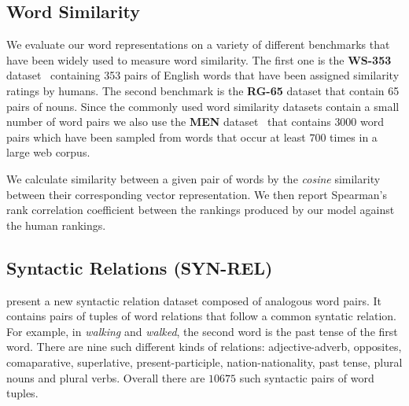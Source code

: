 \documentclass[11pt]{article}
\begin{document}
\subsection{Word Similarity}
\label{sec:word-sim}

We evaluate our word representations on a variety of different benchmarks that
have been widely used to measure word similarity. The first one is the \textbf{WS-353}
dataset~\cite{citeulike:379845} containing 353 pairs of English words that have been 
assigned similarity ratings by humans. The second benchmark is the \textbf{RG-65} 
\cite{Rubenstein:1965:CCS:365628.365657} dataset that contain 65 pairs of nouns. 
Since the commonly used word similarity datasets contain a small number of word pairs we
also use the \textbf{MEN} dataset~\cite{bruni:2012} that contains $3000$ word 
pairs which have been sampled from words
that occur at least $700$ times in a large web corpus. 

We calculate similarity between a given pair of words by the \textit{cosine}
similarity between their corresponding vector representation.
We then report Spearman's rank correlation coefficient 
\cite{citeulike:8703893} between the rankings produced by our model against the human rankings.

\begin{comment}
\subsection{Sentence Completion (SENT)}
The Microsoft Research sentence completion dataset contains $1040$ sentences
from each of which one word has been removed. The task is to correctly predict
the missing word from a given list of $5$ other words per sentence. We average
the word vectors of a given sentence $q_{sent} = \sum_{i=1, i\neq j}^{N} q_{w_i}/N$, where
$w_j$ is the missing word and 
compute the cosine similarity of $q_{sent}$
vector with each of the options. The word with the highest similarity is chosen
as the missing word placeholder.
\end{comment}

\subsection{Syntactic Relations (SYN-REL)}
\label{sec:syn-rel}

 present a new syntactic relation dataset composed of analogous word pairs. 
It contains pairs of tuples of word relations that follow a common syntatic relation. For example, in \textit{walking} and \textit{walked}, the second word is the past tense
of the first word. There are nine such different kinds of relations: adjective-adverb,
opposites, comaparative, superlative, present-participle, 
nation-nationality, past tense, plural nouns and plural verbs.
Overall there are $10675$ such syntactic pairs of word tuples.
\end{document}
